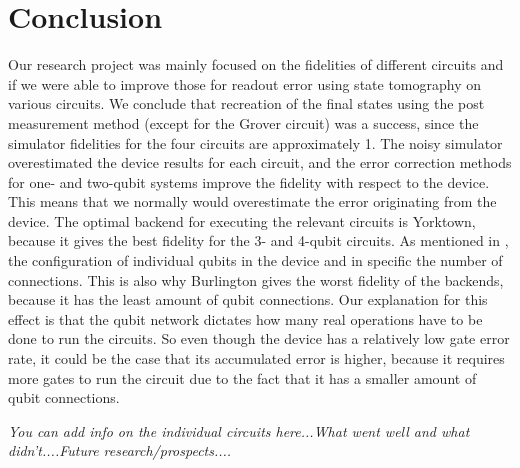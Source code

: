 \section{Conclusion}

Our research project was mainly focused on the fidelities of different circuits and if we were able to improve those for readout error using state tomography on various circuits. We conclude that recreation of the final states using the post measurement method (except for the Grover circuit) was a success, since the simulator fidelities for the four circuits are approximately 1. The noisy simulator overestimated the device results for each circuit, and the error correction methods for one- and two-qubit systems improve the fidelity with respect to the device. This means that we normally would overestimate the error originating from the device. The optimal backend for executing the relevant circuits is Yorktown, because it gives the best fidelity for the 3- and 4-qubit circuits. As mentioned in , the configuration of individual qubits in the device and in specific the number of connections. This is also why Burlington gives the worst fidelity of the backends, because it has the least amount of qubit connections. Our explanation for this effect is that the qubit network dictates how many real operations have to be done to run the circuits. So even though the device has a relatively low gate error rate, it could be the case that its accumulated error is higher, because it requires more gates to run the circuit due to the fact that it has a smaller amount of qubit connections.

{\color{red} \emph{You can add info on the individual circuits here...What went well and what didn't....Future research/prospects....}}

